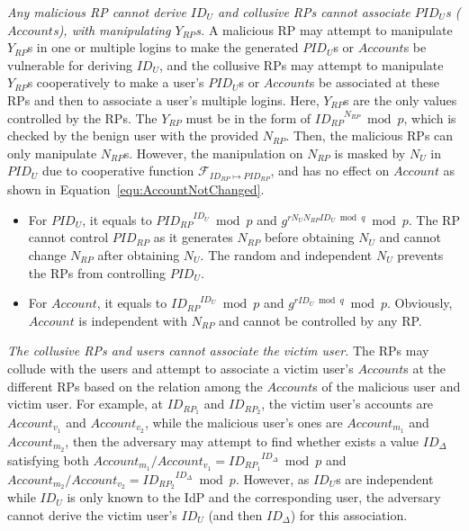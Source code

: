 \emph{Any malicious RP cannot derive $ID_U$ and collusive RPs cannot associate $PID_U$s ($Account$s), with manipulating $Y_{RP}$s.}
A malicious RP may attempt to manipulate $Y_{RP}$s in one or multiple logins
    to make the generated $PID_U$s or $Account$s be vulnerable for deriving $ID_U$,
and the collusive RPs may attempt to manipulate $Y_{RP}$s cooperatively
    to make a user's $PID_U$s or $Account$s be associated at these RPs and then to associate a user's multiple logins.
Here, $Y_{RP}$s are the only values controlled by the RPs.
The $Y_{RP}$ must be in the form of ${ID_{RP}}^{N_{RP}} \bmod p$, which is checked by the benign user with the provided $N_{RP}$.
Then, the malicious RPs can only manipulate $N_{RP}$s.
However, the manipulation on $N_{RP}$ is masked by $N_U$ in $PID_U$
  due to cooperative function $\mathcal{F}_{ID_{RP} \mapsto PID_{RP}}$,
     and has no effect on $Account$ as shown in Equation~\ref{equ:AccountNotChanged}.
\begin{itemize}
  \item For $PID_U$, it equals to ${PID_{RP}}^{ID_U} \bmod p$ and $g^{rN_UN_{RP}ID_U \bmod q} \bmod p$.
         The RP cannot control $PID_{RP}$ as it generates $N_{RP}$ before obtaining $N_U$
            and cannot change $N_{RP}$ after obtaining $N_U$.
         The random and independent $N_U$ prevents the RPs from controlling $PID_U$.
  \item For $Account$, it equals to ${ID_{RP}}^{ID_U} \bmod p$ and $g^{rID_U \bmod q} \bmod p$.
        Obviously, $Account$ is independent with $N_{RP}$ and cannot be controlled by any RP.
\end{itemize}

\emph{The collusive RPs and users cannot associate the victim user.}
The RPs may collude with the users
  and attempt to associate a victim user's $Account$s  at the different RPs
     based on the relation among the $Account$s of the malicious user and victim user.
For example, at $ID_{RP_1}$ and $ID_{RP_2}$, the victim user's accounts are $Account_{v_1}$ and $Account_{v_2}$,
 while the malicious user's ones are $Account_{m_1}$ and $Account_{m_2}$,
  then the adversary may attempt to find whether exists a value $ID_{\Delta}$ satisfying both $Account_{m_1}/Account_{v_1}={ID_{RP_1}}^{ID_{\Delta}} \bmod p$ and $Account_{m_2}/Account_{v_2}={ID_{RP_2}}^{ID_{\Delta}} \bmod p$.
However, as $ID_U$s are independent while $ID_U$ is only known to the IdP and the corresponding user,
  the adversary cannot derive the victim user's $ID_U$ (and then $ID_{\Delta}$) for this association.

